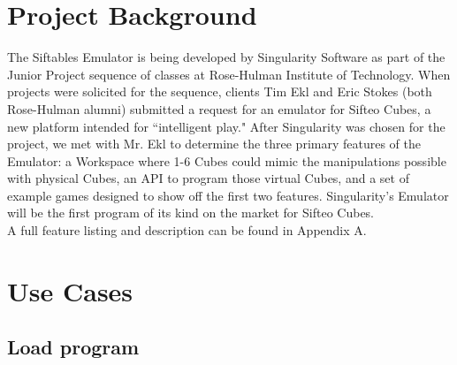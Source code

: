 \documentclass[12pt]{article}
\begin{document}
\section{Project Background}
The Siftables Emulator is being developed by Singularity Software as part of the Junior Project sequence of classes at Rose-Hulman Institute of Technology. When projects were solicited for the sequence, clients Tim Ekl and Eric Stokes (both Rose-Hulman alumni) submitted a request for an emulator for Sifteo Cubes, a new platform intended for ``intelligent play." After Singularity was chosen for the project, we met with Mr. Ekl to determine the three primary features of the Emulator: a Workspace where 1-6 Cubes could mimic the manipulations possible with physical Cubes, an \gls{API} to program those virtual Cubes, and a set of example games designed to show off the first two features. Singularity's Emulator will be the first program of its kind on the market for Sifteo Cubes. \\

A full feature listing and description can be found in Appendix A.

\clearpage

\section{Use Cases}

  \subsection{Load program}
\end{document}
